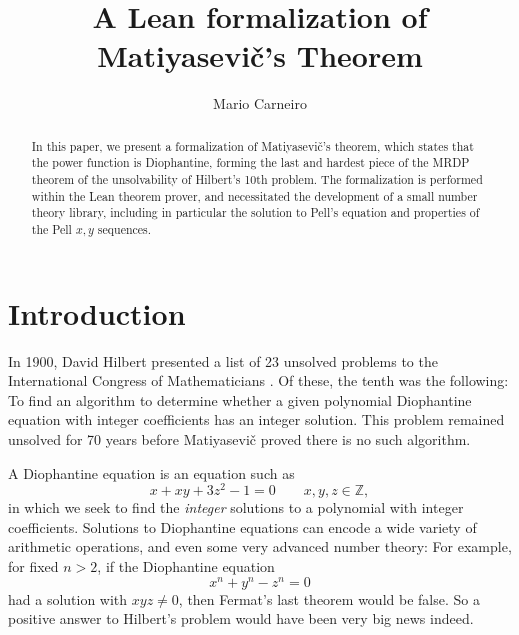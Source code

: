 \documentclass{llncs}
\newcommand{\Z}{\mathbb{Z}}
\begin{document}
\title{A Lean formalization of Matiyasevi\v{c}'s Theorem}
%
%
\author{Mario Carneiro}
%
%
%

\maketitle              %

\begin{abstract}
In this paper, we present a formalization of Matiyasevi\v{c}'s theorem, which states that the power function is Diophantine, forming the last and hardest piece of the MRDP theorem of the unsolvability of Hilbert's 10th problem. The formalization is performed within the Lean theorem prover, and necessitated the development of a small number theory library, including in particular the solution to Pell's equation and properties of the Pell $x,y$ sequences.
\end{abstract}
%
\section{Introduction}
%
In 1900, David Hilbert presented a list of 23 unsolved problems to the International Congress of Mathematicians \cite{hilbert}. Of these, the tenth was the following: To find an algorithm to determine whether a given polynomial Diophantine equation with integer coefficients has an integer solution. This problem remained unsolved for 70 years before Matiyasevi\v{c} proved there is no such algorithm.

A Diophantine equation is an equation such as
$$x+xy+3z^2-1=0\qquad x,y,z\in\Z,$$
in which we seek to find the \emph{integer} solutions to a polynomial with integer coefficients. Solutions to Diophantine equations can encode a wide variety of arithmetic operations, and even some very advanced number theory: For example, for fixed $n>2$, if the Diophantine equation $$x^n+y^n-z^n=0$$ had a solution with $xyz\ne 0$, then Fermat's last theorem would be false. So a positive answer to Hilbert's problem would have been very big news indeed.
\end{document}
